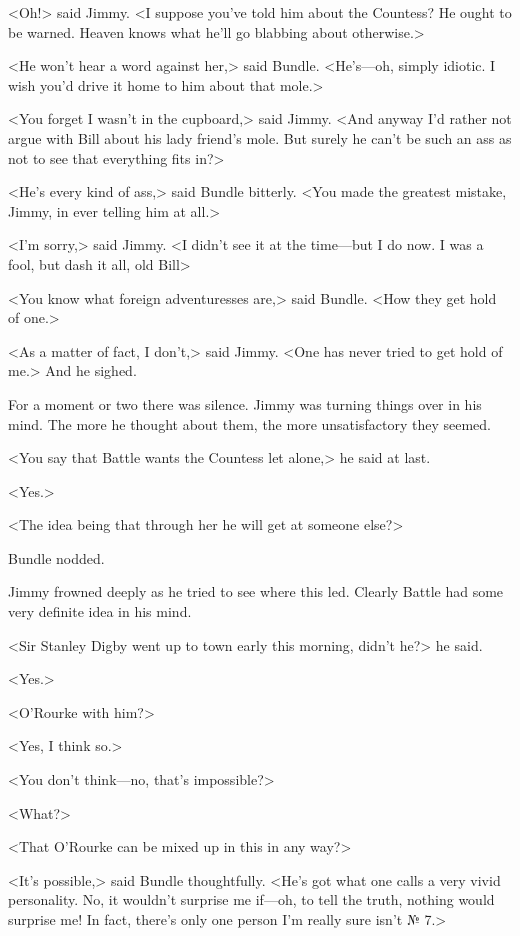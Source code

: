 <Oh!> said Jimmy. <I suppose you've told him about the Countess? He ought to be warned. Heaven knows what he'll go blabbing about otherwise.>

<He won't hear a word against her,> said Bundle. <He's—oh, simply idiotic. I wish you'd drive it home to him about that mole.>

<You forget I wasn't in the cupboard,> said Jimmy. <And anyway I'd rather not argue with Bill about his lady friend's mole. But surely he can't be such an ass as not to see that everything fits in?>

<He's every kind of ass,> said Bundle bitterly. <You made the greatest mistake, Jimmy, in ever telling him at all.>

<I'm sorry,> said Jimmy. <I didn't see it at the time—but I do now. I was a fool, but dash it all, old Bill\longdash>

<You know what foreign adventuresses are,> said Bundle. <How they get hold of one.>

<As a matter of fact, I don't,> said Jimmy. <One has never tried to get hold of me.> And he sighed.

For a moment or two there was silence. Jimmy was turning things over in his mind. The more he thought about them, the more unsatisfactory they seemed.

<You say that Battle wants the Countess let alone,> he said at last.

<Yes.>

<The idea being that through her he will get at someone else?>

Bundle nodded.

Jimmy frowned deeply as he tried to see where this led. Clearly Battle had some very definite idea in his mind.

<Sir Stanley Digby went up to town early this morning, didn't he?> he said.

<Yes.>

<O'Rourke with him?>

<Yes, I think so.>

<You don't think—no, that's impossible?>

<What?>

<That O'Rourke can be mixed up in this in any way?>

<It's possible,> said Bundle thoughtfully. <He's got what one calls a very vivid personality. No, it wouldn't surprise me if—oh, to tell the truth, nothing would surprise me! In fact, there's only one person I'm really sure isn't № 7.>

